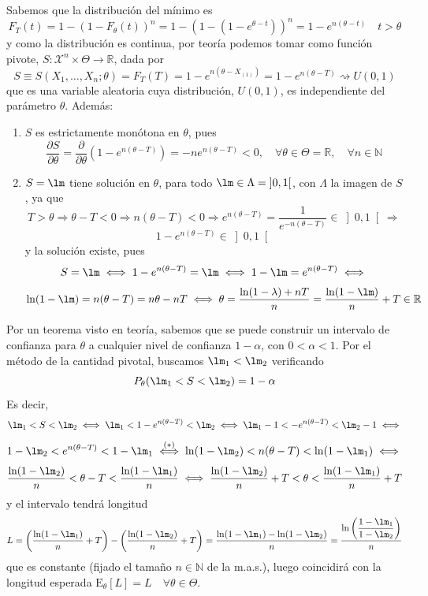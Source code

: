 \documentclass[12pt]{article}
\newcommand{\E}{\mathrm{E}}
\newcommand{\R}{\mathbb{R}}
\newcommand{\X}{\mathcal{X}}
\newcommand{\N}{\mathbb{N}}
\begin{document}
\begin{ejercicio}
\begin{enumerate}[label=\alph*)]
            Sabemos que la distribución del mínimo es
            $$F_T(t) = 1 - (1 - F_\theta(t))^n = 1 - (1 - (1-e^{\theta-t}))^n = 1 - e^{n(\theta - t)} \quad t > \theta$$
            y como la distribución es continua, por teoría podemos tomar como función pivote, 
            $S : \X^n \times \Theta \to \R$, dada por 
            $$S \equiv S(X_1, \ldots, X_n; \theta) = F_T(T) = 1 - e^{n(\theta - X_{(1)})} = 1 - e^{n(\theta - T)} \rightsquigarrow U(0,1)$$ que es
            una variable aleatoria cuya distribución, $U(0,1)$, es independiente del parámetro $\theta$.
            Además:
            \begin{enumerate}
                \item $S$ es estrictamente monótona en $\theta$, pues
                $$\dfrac{\partial S}{\partial \theta} = \dfrac{\partial}{\partial \theta} (1 - e^{n(\theta - T)}) = - ne^{n(\theta - T)} < 0, \quad \forall \theta \in \Theta = \R, \quad \forall n \in \N$$
                \item $S = \lm$ tiene solución en $\theta$, para todo $\lm \in \Lambda = \left]0, 1 \right[$, con $\Lambda$ la imagen de $S$, ya que
                $$T > \theta \Longrightarrow \theta - T < 0 \Longrightarrow n(\theta - T) < 0 \Longrightarrow e^{n(\theta - T)} = \dfrac{1}{e^{-n(\theta-T)}} \in \left]0, 1 \right[ \Longrightarrow$$
                $$1 - e^{n(\theta - T)} \in \left]0,1\right[$$
                y la solución existe, pues
                $$S = \lm \iff 1 - e^{n(\theta - T)} = \lm \iff 1 - \lm = e^{n(\theta - T)} \iff$$
                $$\ln(1-\lm) = n(\theta -T) = n\theta - nT \iff \theta = \dfrac{\ln(1-\lambda)  + nT}{n} = \dfrac{\ln(1-\lm)}{n} + T \in \R$$ 
            \end{enumerate}
            Por un teorema visto en teoría, sabemos que se puede construir un intervalo de confianza para $\theta$ a cualquier nivel
            de confianza $1-\alpha$, con $0 < \alpha < 1$. Por el método de la cantidad pivotal, buscamos $\lm_1 < \lm_2$ 
            verificando $$P_\theta(\lm_1 < S < \lm_2) = 1 - \alpha$$
            Es decir,
            $$\lm_1 < S < \lm_2 \iff \lm_1 < 1 - e^{n(\theta - T)} < \lm_2 \iff \lm_1 - 1 < - e^{n(\theta - T)} < \lm_2 - 1 \iff $$
            $$1 - \lm_2 < e^{n(\theta - T)} < 1 - \lm_1 \stackrel{(*)}{\iff} \ln(1-\lm_2) < n(\theta-T) < \ln(1-\lm_1) \iff $$
            $$\dfrac{\ln(1-\lm_2)}{n} < \theta-T < \dfrac{\ln(1-\lm_1)}{n} \iff \dfrac{\ln(1-\lm_2)}{n} + T < \theta < \dfrac{\ln(1-\lm_1)}{n} + T$$
            y el intervalo tendrá longitud $$L = \left(\dfrac{\ln(1-\lm_1)}{n} + T \right) - \left(\dfrac{\ln(1-\lm_2)}{n} + T \right) = \dfrac{\ln(1-\lm_1) - \ln(1-\lm_2)}{n} = 
            \dfrac{\ln \left( \dfrac{1-\lm_1}{1-\lm_2} \right)}{n}$$ que es constante (fijado el tamaño $n \in \N$ de la m.a.s.), luego coincidirá 
            con la longitud esperada $\E_\theta[L] = L \quad \forall \theta \in \Theta$. \\
            

\end{enumerate}
\end{ejercicio}
\end{document}
